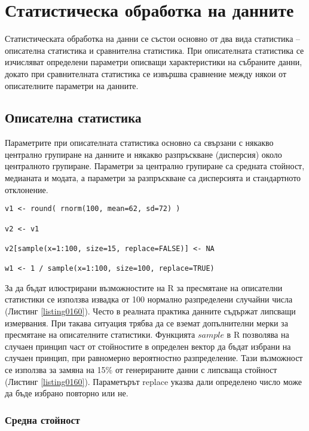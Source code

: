 \newpage
\chapter{Статистическа обработка на данните}
\label{chapter09}
\thispagestyle{empty}

Статистическата обработка на данни се състои основно от два вида статистика – описателна статистика и сравнителна статистика. При описателната статистика се изчисляват определени параметри описващи характеристики на събраните данни, докато при сравнителната статистика се извършва сравнение между някои от описателните параметри на данните. 

\section{Описателна статистика}

Параметрите при описателната статистика основно са свързани с някакво централно групиране на данните и някакво разпръскване (дисперсия) около централното групиране. Параметри за централно групиране са средната стойност, медианата и модата, а параметри за разпръскване са дисперсията и стандартното отклонение.

\begin{lstlisting}[caption=Генериране на извадка от случайни числа, label=listing0160]
v1 <- round( rnorm(100, mean=62, sd=72) )

v2 <- v1

v2[sample(x=1:100, size=15, replace=FALSE)] <- NA

w1 <- 1 / sample(x=1:100, size=100, replace=TRUE)
\end{lstlisting}

За да бъдат илюстрирани възможностите на R за пресмятане на описателни статистики се използва извадка от 100 нормално разпределени случайни числа (Листинг \ref{listing0160}). Често в реалната практика данните съдържат липсващи измервания. При такава ситуация трябва да се вземат допълнителни мерки за пресмятане на описателните статистики. Функцията $sample$ в R позволява на случаен принцип част от стойностите в определен вектор да бъдат избрани на случаен принцип, при равномерно вероятностно разпределение. Тази възможност се използва за замяна на 15\% от генерираните данни с липсваща стойност (Листинг \ref{listing0160}). Параметърът replace указва дали определено число може да бъде избрано повторно или не.

\subsection{Средна стойност}

